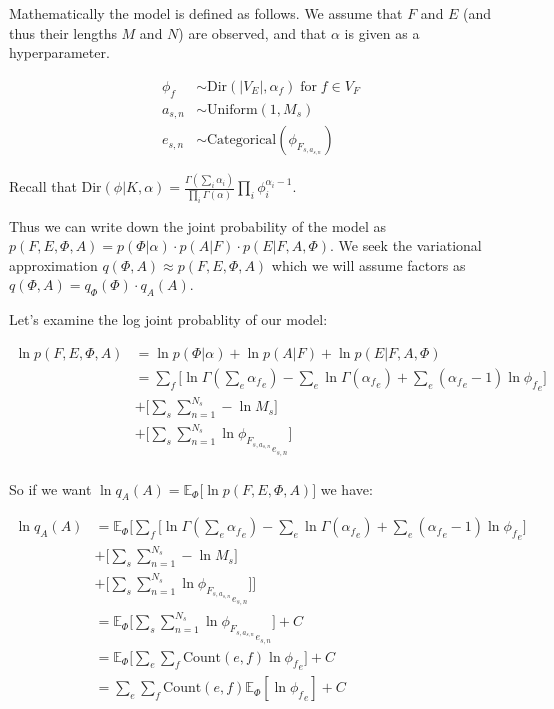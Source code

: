 \documentclass[11pt]{article}
\begin{document}
Mathematically the model is defined as follows. We assume that $F$ and $E$ (and thus their lengths $M$ and $N$) are observed, and that $\alpha$ is given as a hyperparameter.

\begin{align*}
\phi_f &\sim \text{Dir}(|V_E|, \alpha_f)\;\text{for}\;f \in V_F \\
a_{s,n} &\sim \text{Uniform}(1, M_s) \\
e_{s,n} &\sim \text{Categorical}(\phi_{F_{s, a_{s, n}}})
\end{align*}

Recall that $\text{Dir}(\phi | K, \alpha) = \frac{\Gamma(\sum_i\alpha_i)}{\prod_i\Gamma(\alpha)} \prod_{i} \phi_i^{\alpha_i - 1}$.

Thus we can write down the joint probability of the model as
$p(F, E, \Phi, A) = p(\Phi | \alpha) \cdot p(A | F) \cdot p(E | F, A, \Phi)$.
We seek the variational approximation $q(\Phi, A) \approx p(F, E, \Phi, A)$ which we will assume factors as $q(\Phi, A) = q_\Phi(\Phi) \cdot q_A(A)$.

Let's examine the log joint probablity of our model:

\begin{align*}
\ln p(F, E, \Phi, A) &= \ln p(\Phi | \alpha) + \ln p(A | F) + \ln p(E | F, A, \Phi) \\
&= \sum_f \big[ \ln \Gamma(\sum_e {\alpha_f}_e) - \sum_e \ln \Gamma({\alpha_f}_e) + \sum_e ({\alpha_f}_e - 1) \ln {\phi_f}_e \big] \\
&+ \big[\sum_s \sum_{n=1}^{N_s} -\ln M_s \big] \\
&+ \big[ \sum_s \sum_{n=1}^{N_s} \ln {\phi_{F_{s, a_{s, n}}}}_{e_{s,n}} \big] \\
\end{align*}

So if we want $\ln q_A(A) = \mathbb{E}_\Phi \big[ \ln p(F, E, \Phi, A) \big]$ we have:

\begin{align*}
\ln q_A(A) &= \mathbb{E}_\Phi \bigg[ \sum_f \big[ \ln \Gamma(\sum_e {\alpha_f}_e) - \sum_e \ln \Gamma({\alpha_f}_e) + \sum_e ({\alpha_f}_e - 1) \ln {\phi_f}_e \big] \\
&+ \big[\sum_s \sum_{n=1}^{N_s} -\ln M_s \big]\\
&+ \big[ \sum_s \sum_{n=1}^{N_s} \ln {\phi_{F_{s, a_{s, n}}}}_{e_{s,n}} \big] \bigg] \\
&= \mathbb{E}_\Phi \bigg[ \sum_s \sum_{n=1}^{N_s} \ln {\phi_{F_{s, a_{s, n}}}}_{e_{s,n}} \bigg] + C \\
&= \mathbb{E}_\Phi \bigg[ \sum_e \sum_f \text{Count}(e, f) \ln{\phi_f}_e \bigg] + C \\
&= \sum_e \sum_f \text{Count}(e, f) \mathbb{E}_\Phi [\ln {\phi_f}_e] + C \\
\end{align*}
\end{document}
